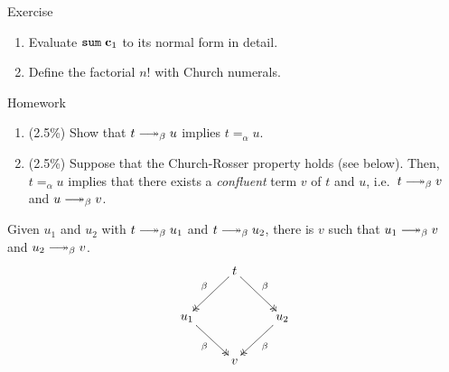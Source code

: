 
\begin{frame}{Exercise}
  \begin{enumerate}
    \item Evaluate $\mathtt{sum}\;\mathbf{c}_1$ to its normal form in detail.
    \item Define the factorial $n!$ with Church numerals.
  \end{enumerate}
\end{frame}

\begin{frame}{Homework}
  \begin{enumerate}
    \item (2.5\%) Show that $t \reduce u$ implies $t =_\alpha u$. 
    \item (2.5\%) Suppose that the Church-Rosser property holds (see below).
      Then, $t =_\alpha u$ implies that there exists a \emph{confluent} term $v$ of $t$ and $u$, i.e.\ $t \reduce v$ and $u \reduce v$.
  \end{enumerate}
  \begin{theorem}
    Given $u_1$ and $u_2$ with $t \reduce u_1$ and $t\reduce u_2$, there is $v$
    such that $u_1 \reduce v$ and $u_2 \reduce v$. 
    \[
      \xymatrix{
        & t \ar@{->>}[rd]^{\beta} \ar@{->>}[ld]_{\beta} \\
        u_1 \ar@{->>}[rd]_{\beta} & & u_2 \ar@{->>}[ld]^{\beta} \\
        & v
      }
    \]
  \end{theorem}
\end{frame}

